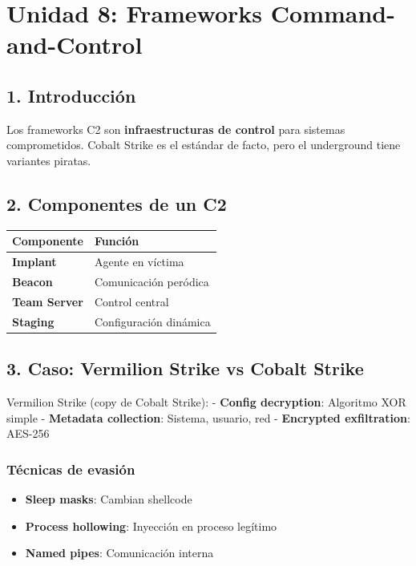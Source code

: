 \documentclass[
  letterpaper,
]{report}
\newcounter{none} %
\providecommand{\tightlist}{%
  \setlength{\itemsep}{0pt}\setlength{\parskip}{0pt}}
\begin{document}
\chapter{Unidad 8: Frameworks
Command-and-Control}\label{unidad-8-frameworks-command-and-control}

\section{1. Introducción}\label{introducciuxf3n-7}

Los frameworks C2 son \textbf{infraestructuras de control} para sistemas
comprometidos. Cobalt Strike es el estándar de facto, pero el
underground tiene variantes piratas.

\section{2. Componentes de un C2}\label{componentes-de-un-c2}

{\def\LTcaptype{none} %
\begin{longtable}[]{@{}ll@{}}
\toprule\noalign{}
Componente & Función \\
\midrule\noalign{}
\endhead
\bottomrule\noalign{}
\endlastfoot
\textbf{Implant} & Agente en víctima \\
\textbf{Beacon} & Comunicación peródica \\
\textbf{Team Server} & Control central \\
\textbf{Staging} & Configuración dinámica \\
\end{longtable}
}

\section{3. Caso: Vermilion Strike vs Cobalt
Strike}\label{caso-vermilion-strike-vs-cobalt-strike}

Vermilion Strike (copy de Cobalt Strike): - \textbf{Config decryption}:
Algoritmo XOR simple - \textbf{Metadata collection}: Sistema, usuario,
red - \textbf{Encrypted exfiltration}: AES-256

\subsection{Técnicas de evasión}\label{tuxe9cnicas-de-evasiuxf3n}

\begin{itemize}
\tightlist
\item
  \textbf{Sleep masks}: Cambian shellcode
\item
  \textbf{Process hollowing}: Inyección en proceso legítimo
\item
  \textbf{Named pipes}: Comunicación interna
\end{itemize}
\end{document}
